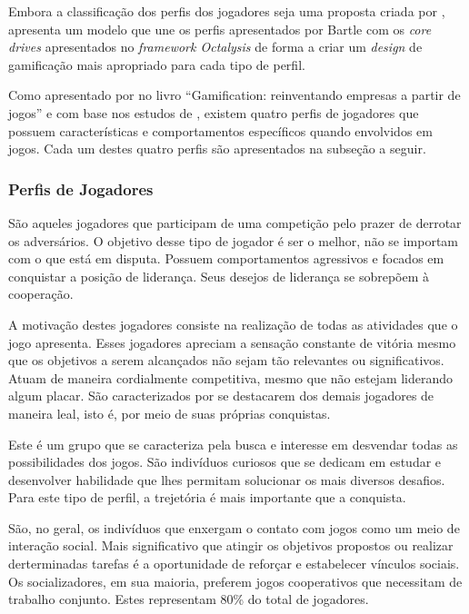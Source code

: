 
Embora a classificação dos perfis dos jogadores seja uma proposta criada por ,  apresenta um modelo
que une os perfis apresentados por Bartle com os \textit{core drives} apresentados no \textit{framework Octalysis} de forma a criar um \textit{design} de gamificação
mais apropriado para cada tipo de perfil.

Como apresentado por  no livro ``Gamification: reinventando empresas a partir de jogos'' e com base nos estudos de , 
existem quatro perfis de jogadores que possuem características e comportamentos específicos quando envolvidos em jogos. Cada um destes quatro perfis são apresentados na
subseção a seguir.

\subsubsection{Perfis de Jogadores}

São aqueles jogadores que participam de uma competição pelo prazer de derrotar os adversários. O objetivo desse tipo de jogador é ser o melhor, não 
se importam com o que está em disputa. Possuem comportamentos agressivos e focados em conquistar a posição de liderança. Seus desejos de liderança se 
sobrepõem à cooperação.

A motivação destes jogadores consiste na realização de todas as atividades que o jogo apresenta. Esses jogadores apreciam a sensação constante
de vitória mesmo que os objetivos a serem alcançados não sejam tão relevantes ou significativos. Atuam de maneira cordialmente competitiva, mesmo que não estejam
liderando algum placar. São caracterizados por se destacarem dos demais jogadores de maneira leal, isto é, por meio de suas próprias conquistas.

Este é um grupo que se caracteriza pela busca e interesse em desvendar todas as possibilidades dos jogos. São indivíduos curiosos que se dedicam em estudar
e desenvolver habilidade que lhes permitam solucionar os mais diversos desafios. Para este tipo de perfil, a trejetória é mais importante que a conquista.

São, no geral, os indivíduos que enxergam o contato com jogos como um meio de interação social. Mais significativo que atingir os objetivos propostos ou
realizar derterminadas tarefas é a oportunidade de reforçar e estabelecer vínculos sociais. Os socializadores, em sua maioria, preferem jogos cooperativos
que necessitam de trabalho conjunto. Estes representam 80\% do total de jogadores.

